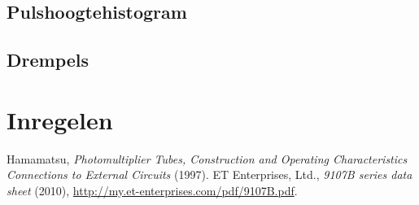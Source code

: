 \subsection{Pulshoogtehistogram}
\subsection{Drempels}

\section{Inregelen \pmts}


\begin{thebibliography}{9}
 Hamamatsu, \emph{Photomultiplier Tubes, Construction
and Operating Characteristics Connections to External Circuits} (1997).
 ET Enterprises, Ltd., \emph{9107B series data sheet}
(2010), \url{http://my.et-enterprises.com/pdf/9107B.pdf}.
\end{thebibliography}


